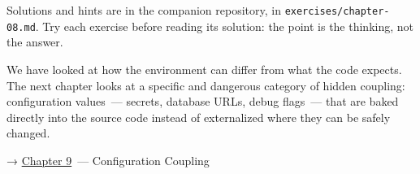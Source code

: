 \noindent{}Solutions and hints are in the companion repository, in \texttt{exercises/}\allowbreak{}\texttt{chapter-08.md}. Try each exercise before reading its solution: the point is the thinking, not the answer.

\label{08-hidden-dependencies:whats-next}

We have looked at how the environment can differ from what the code expects. The next chapter looks at a specific and dangerous category of hidden coupling: configuration values~--- secrets, database URLs, debug flags~--- that are baked directly into the source code instead of externalized where they can be safely changed.

\noindent{}→ \hyperref[ch:09-configuration-coupling]{Chapter 9}~--- Configuration Coupling
